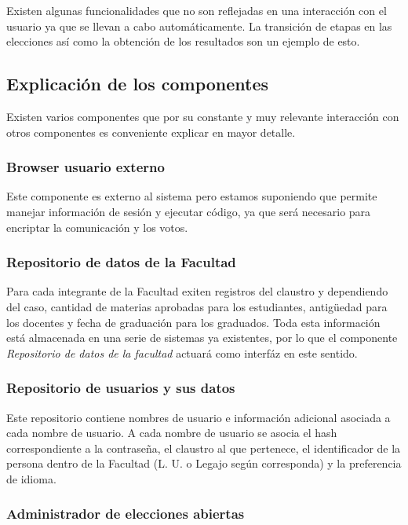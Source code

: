 Existen algunas funcionalidades que no son reflejadas en una interacción con el usuario ya que se llevan a cabo automáticamente. La transición de etapas en las elecciones así como la obtención de los resultados son un ejemplo de esto.



\subsection{Explicación de los componentes}
\label{explicaciones}
Existen varios componentes que por su constante y muy relevante interacción con otros componentes es conveniente explicar en mayor detalle.

\subsubsection{Browser usuario externo}

Este componente es externo al sistema pero estamos suponiendo que permite manejar información de sesión y ejecutar código, ya que será necesario para encriptar la comunicación y los votos. 


\subsubsection{Repositorio de datos de la Facultad}
Para cada integrante de la Facultad exiten registros del claustro y dependiendo del caso, cantidad de materias aprobadas para los estudiantes, antigüedad para los docentes y fecha de graduación para los graduados. Toda esta información está almacenada en una serie de sistemas ya existentes, por lo que el componente \emph{Repositorio de datos de la facultad} actuará como interfáz en este sentido.


\subsubsection{Repositorio de usuarios y sus datos}


Este repositorio contiene nombres de usuario e información adicional asociada a cada nombre de usuario. A cada nombre de usuario se asocia el hash correspondiente a la contraseña, el claustro al que pertenece, el identificador de la persona dentro de la Facultad (L. U. o Legajo según corresponda) y la preferencia de idioma. 


\subsubsection{Administrador de elecciones abiertas}

